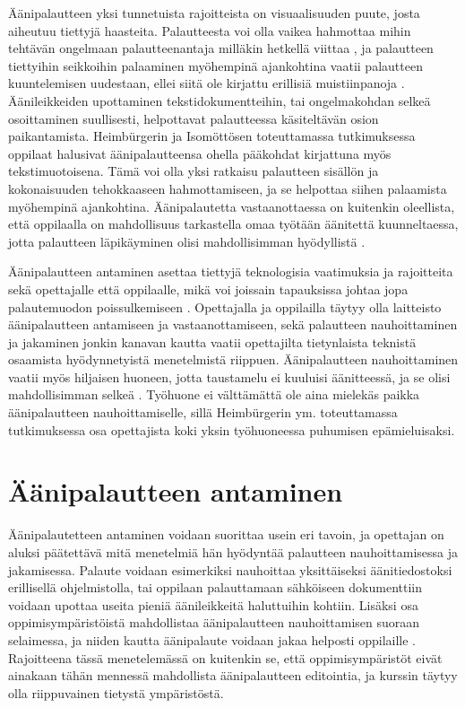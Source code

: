 \documentclass[utf8]{gradu3}
\begin{document}
Äänipalautteen yksi tunnetuista rajoitteista on visuaalisuuden puute, josta aiheutuu tiettyjä haasteita. Palautteesta voi olla vaikea hahmottaa mihin tehtävän ongelmaan palautteenantaja milläkin hetkellä viittaa \parencite{versus}, ja palautteen tiettyihin seikkoihin palaaminen myöhempinä ajankohtina vaatii palautteen kuuntelemisen uudestaan, ellei siitä ole kirjattu erillisiä muistiinpanoja \parencite{evaluating}. Äänileikkeiden upottaminen tekstidokumentteihin, tai ongelmakohdan selkeä osoittaminen suullisesti, helpottavat palautteessa käsiteltävän osion paikantamista. Heimbürgerin ja Isomöttösen \parencite*{moderating} toteuttamassa tutkimuksessa oppilaat halusivat äänipalautteensa ohella pääkohdat kirjattuna myös tekstimuotoisena. Tämä voi olla yksi ratkaisu palautteen sisällön ja kokonaisuuden tehokkaaseen hahmottamiseen, ja se helpottaa siihen palaamista myöhempinä ajankohtina. Äänipalautetta vastaanottaessa on kuitenkin oleellista, että oppilaalla on mahdollisuus tarkastella omaa työtään äänitettä kuunneltaessa, jotta palautteen läpikäyminen olisi mahdollisimman hyödyllistä \parencite{usingAudio}.

Äänipalautteen antaminen asettaa tiettyjä teknologisia vaatimuksia ja rajoitteita sekä opettajalle että oppilaalle, mikä voi joissain tapauksissa johtaa jopa palautemuodon poissulkemiseen \parencite{developing}. Opettajalla ja oppilailla täytyy olla laitteisto äänipalautteen antamiseen ja vastaanottamiseen, sekä palautteen nauhoittaminen ja jakaminen jonkin kanavan kautta vaatii opettajilta tietynlaista teknistä osaamista hyödynnetyistä menetelmistä riippuen. Äänipalautteen nauhoittaminen vaatii myös hiljaisen huoneen, jotta taustamelu ei kuuluisi äänitteessä, ja se olisi mahdollisimman selkeä \parencite{developing}. Työhuone ei välttämättä ole aina mielekäs paikka äänipalautteen nauhoittamiselle, sillä Heimbürgerin ym. \parencite*{academics} toteuttamassa tutkimuksessa
osa opettajista koki yksin työhuoneessa puhumisen epämieluisaksi.

\section{Äänipalautteen antaminen}

Äänipalautetteen antaminen voidaan suorittaa usein eri tavoin, ja opettajan on aluksi päätettävä mitä menetelmiä hän hyödyntää palautteen nauhoittamisessa ja jakamisessa. Palaute voidaan esimerkiksi nauhoittaa yksittäiseksi äänitiedostoksi erillisellä ohjelmistolla, tai oppilaan palauttamaan sähköiseen dokumenttiin voidaan upottaa useita pieniä äänileikkeitä haluttuihin kohtiin. Lisäksi osa oppimisympäristöistä mahdollistaa äänipalautteen nauhoittamisen suoraan selaimessa, ja niiden kautta äänipalaute voidaan jakaa helposti oppilaille \parencite{using}. Rajoitteena tässä menetelemässä on kuitenkin se, että oppimisympäristöt eivät ainakaan tähän mennessä mahdollista äänipalautteen editointia, ja kurssin täytyy olla riippuvainen tietystä ympäristöstä.
\end{document}
